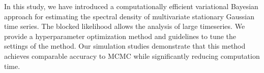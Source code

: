 \documentclass[%
 reprint,
 amsmath,amssymb,
 aps,
 nofootinbib,
]{revtex4-2}
\begin{document}







In this study, we have introduced a computationally efficient variational Bayesian approach for estimating the spectral density of multivariate stationary Gaussian time series. 
The blocked likelihood allows the analysis of large timeseries.
We provide a hyperparameter optimization method and guidelines to tune the settings of the method. 
Our simulation studies demonstrate that this method achieves comparable accuracy to MCMC while significantly reducing computation time. 
\end{document}
